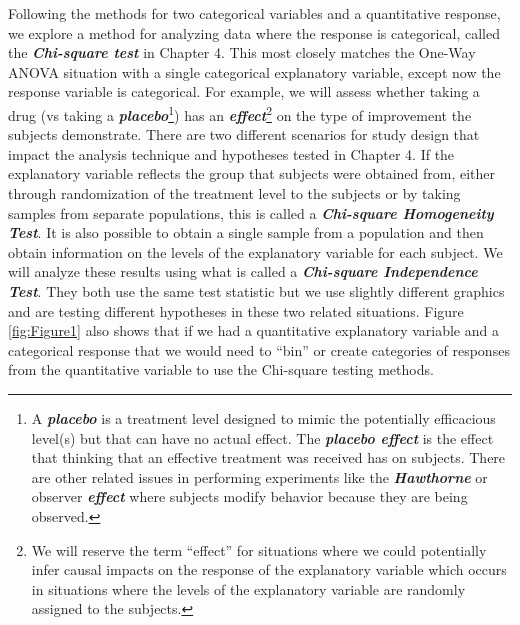 \documentclass[]{article}
\let\rmarkdownfootnote\footnote%
\def\footnote{\protect\rmarkdownfootnote}
\begin{document}
Following the methods for two categorical variables and a quantitative
response, we explore a method for analyzing data where the response is
categorical, called the \textbf{\emph{Chi-square test}} in Chapter 4.
This most closely matches the One-Way ANOVA situation with a single
categorical explanatory variable, except now the response variable is
categorical. For example, we will assess whether taking a drug (vs
taking a \textbf{\emph{placebo}}\footnote{A \textbf{\emph{placebo}} is a
  treatment level designed to mimic the potentially efficacious level(s)
  but that can have no actual effect. The \textbf{\emph{placebo effect}}
  is the effect that thinking that an effective treatment was received
  has on subjects. There are other related issues in performing
  experiments like the \textbf{\emph{Hawthorne}} or observer
  \textbf{\emph{effect}} where subjects modify behavior because they are
  being observed.}) has an \textbf{\emph{effect}}\footnote{We will
  reserve the term ``effect'' for situations where we could potentially
  infer causal impacts on the response of the explanatory variable which
  occurs in situations where the levels of the explanatory variable are
  randomly assigned to the subjects.} on the type of improvement the
subjects demonstrate. There are two different scenarios for study design
that impact the analysis technique and hypotheses tested in Chapter 4.
If the explanatory variable reflects the group that subjects were
obtained from, either through randomization of the treatment level to
the subjects or by taking samples from separate populations, this is
called a \textbf{\emph{Chi-square Homogeneity Test}}. It is also
possible to obtain a single sample from a population and then obtain
information on the levels of the explanatory variable for each subject.
We will analyze these results using what is called a
\textbf{\emph{Chi-square Independence Test}}. They both use the same
test statistic but we use slightly different graphics and are testing
different hypotheses in these two related situations. Figure
\ref{fig:Figure1} also shows that if we had a quantitative explanatory
variable and a categorical response that we would need to ``bin'' or
create categories of responses from the quantitative variable to use the
Chi-square testing methods.
\end{document}
